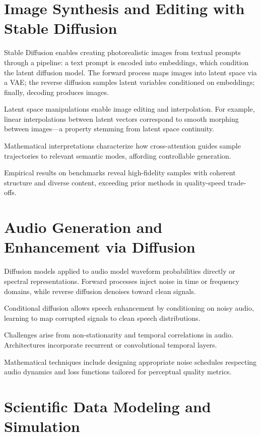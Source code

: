 \documentclass[a4paper,12pt,oneside]{memoir}
\begin{document}
\section{Image Synthesis and Editing with Stable Diffusion}

Stable Diffusion enables creating photorealistic images from textual prompts through a pipeline: a text prompt is encoded into embeddings, which condition the latent diffusion model. The forward process maps images into latent space via a VAE; the reverse diffusion samples latent variables conditioned on embeddings; finally, decoding produces images.

Latent space manipulations enable image editing and interpolation. For example, linear interpolations between latent vectors correspond to smooth morphing between images—a property stemming from latent space continuity.

Mathematical interpretations characterize how cross-attention guides sample trajectories to relevant semantic modes, affording controllable generation.

Empirical results on benchmarks reveal high-fidelity samples with coherent structure and diverse content, exceeding prior methods in quality-speed trade-offs.

\section{Audio Generation and Enhancement via Diffusion}

Diffusion models applied to audio model waveform probabilities directly or spectral representations. Forward processes inject noise in time or frequency domains, while reverse diffusion denoises toward clean signals.

Conditional diffusion allows speech enhancement by conditioning on noisy audio, learning to map corrupted signals to clean speech distributions.

Challenges arise from non-stationarity and temporal correlations in audio. Architectures incorporate recurrent or convolutional temporal layers.

Mathematical techniques include designing appropriate noise schedules respecting audio dynamics and loss functions tailored for perceptual quality metrics.

\section{Scientific Data Modeling and Simulation}
\end{document}
